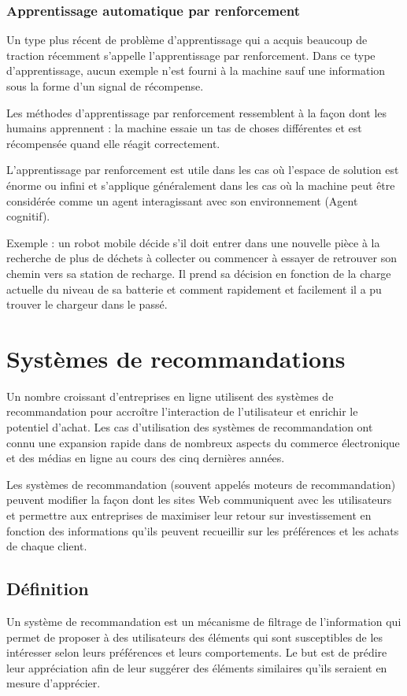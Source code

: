 \subsubsection{Apprentissage automatique par renforcement}
Un type plus récent de problème d'apprentissage qui a acquis beaucoup de traction récemment s'appelle l'apprentissage par renforcement. Dans ce type d'apprentissage, aucun exemple n'est fourni à la machine sauf une information sous la forme d'un signal de récompense.

Les méthodes d'apprentissage par renforcement ressemblent à la façon dont les humains apprennent : la machine essaie un tas de choses différentes et est récompensée quand elle réagit correctement.

L'apprentissage par renforcement est utile dans les cas où l'espace de solution est énorme ou infini et s'applique généralement dans les cas où la machine peut être considérée comme un agent interagissant avec son environnement (Agent cognitif).

Exemple : un robot mobile décide s'il doit entrer dans une nouvelle pièce à la recherche de plus de déchets à collecter ou commencer à essayer de retrouver son chemin vers sa station de recharge. Il prend sa décision en fonction de la charge actuelle du niveau de sa batterie et comment rapidement et facilement il a pu trouver le chargeur dans le passé.

\section{Systèmes de recommandations}
Un nombre croissant d'entreprises en ligne utilisent des systèmes de recommandation pour accroître l'interaction de l'utilisateur et enrichir le potentiel d'achat. Les cas d'utilisation des systèmes de recommandation ont connu une expansion rapide dans de nombreux aspects du commerce électronique et des médias en ligne au cours des cinq dernières années.

Les systèmes de recommandation (souvent appelés \textquotedbl moteurs de recommandation\textquotedbl) peuvent modifier la façon dont les sites Web communiquent avec les utilisateurs et permettre aux entreprises de maximiser leur retour sur investissement en fonction des informations qu'ils peuvent recueillir sur les préférences et les achats de chaque client.

\subsection{Définition}
Un système de recommandation est un mécanisme de filtrage de l'information qui permet de proposer à des utilisateurs des éléments qui sont susceptibles de les intéresser selon leurs préférences et leurs comportements. Le but est de prédire leur appréciation afin de leur suggérer des éléments similaires qu'ils seraient en mesure d'apprécier.


